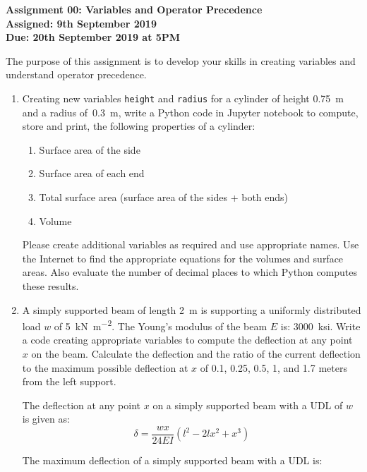 \documentclass[a4paper,12pt]{article}
\begin{document}
\begin{centering}
	\textbf{
		Assignment 00: Variables and Operator Precedence\\
		Assigned: 9th September 2019\\
		Due: 20th September 2019 at 5PM\\
	}
\end{centering}

\vspace{1em}
 
 The purpose of this assignment is to develop your skills in creating variables and understand operator precedence.
 
\begin{enumerate}
	\item Creating new variables \verb|height| and \verb|radius| for a cylinder of height \SI{0.75}{\meter} and a radius of~\SI{0.3}{\meter}, write a Python code in Jupyter notebook to compute, store and print, the following properties of a cylinder:
	\begin{enumerate}
		\item Surface area of the side
		\item Surface area of each end
		\item Total surface area (surface area of the sides + both ends)
		\item Volume
	\end{enumerate}
	Please create additional variables as required and use appropriate names. Use the Internet to find the appropriate equations for the volumes and surface areas. Also evaluate the number of decimal places to which Python computes these results.
	
	\item A simply supported beam of length \SI{2}{\meter} is supporting a uniformly distributed load $w$ of \SI{5}{\kilo \newton \per \meter \squared}. The Young's modulus of the beam $E$ is: \SI{3000}{ksi}. Write a code creating appropriate variables to compute the deflection at any point $x$ on the beam. Calculate the deflection and the ratio of the current deflection to the maximum possible deflection at $x$ of 0.1, 0.25, 0.5, 1, and 1.7 meters from the left support.
	
	The deflection at any point $x$ on a simply supported beam with a UDL of $w$ is given as:
	\begin{equation*}
		\delta = \frac{w x}{24 EI}(l^2 - 2lx^2 + x^3)
	\end{equation*}
	
	The maximum deflection of a simply supported beam with a UDL is:
	

\end{enumerate}
\end{document}
